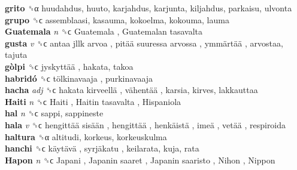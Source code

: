 \textbf{grito} ␝α  huudahdus, huuto, karjahdus, karjunta, kiljahdus, parkaisu, ulvonta  \\
\textbf{grupo} ␝ϲ  assemblaasi, kasauma, kokoelma, kokouma, lauma  \\
\textbf{Guatemala} \emph{n}  ␝ϲ   Guatemala ,  Guatemalan tasavalta   \\
\textbf{gusta} \emph{v}  ␝ϲ   antaa jllk arvoa ,  pitää suuressa arvossa ,  ymmärtää , arvostaa, tajuta  \\
\textbf{gòlpi} ␝ϲ   jyskyttää , hakata, takoa  \\
\textbf{habridó} ␝ϲ   tölkinavaaja , purkinavaaja  \\
\textbf{hacha} \emph{adj}  ␝ϲ   hakata kirveellä ,  vähentää , karsia, kirves, lakkauttaa  \\
\textbf{Haiti} \emph{n}  ␝ϲ   Haiti ,  Haitin tasavalta ,  Hispaniola   \\
\textbf{hal} \emph{n}  ␝ϲ  sappi, sappineste  \\
\textbf{hala} \emph{v}  ␝ϲ   hengittää sisään ,  hengittää ,  henkäistä ,  imeä ,  vetää , respiroida  \\
\textbf{haltura} ␝α  altitudi, korkeus, korkeuskulma  \\
\textbf{hanchi} ␝ϲ   käytävä ,  syrjäkatu , keilarata, kuja, rata  \\
\textbf{Hapon} \emph{n}  ␝ϲ   Japani ,  Japanin saaret ,  Japanin saaristo ,  Nihon ,  Nippon   \\

